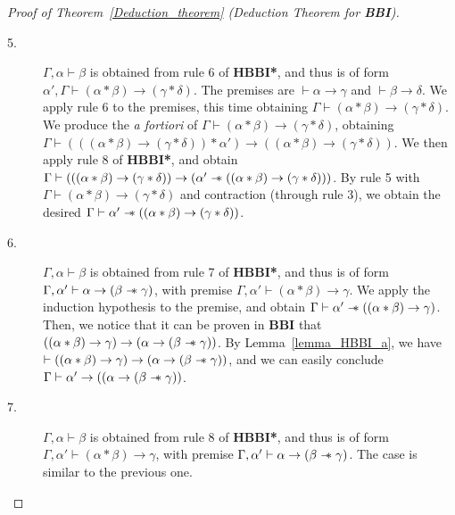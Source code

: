\documentclass[a4paper]{article}
\newcommand\magicwand{\mathrel{-\mkern-6mu*}}
\newcommand{\BBI}{\textbf{BBI}\xspace}
\begin{document}
\begin{proof}[Proof of Theorem~\ref{Deduction_theorem} (Deduction Theorem for \BBI)]
\begin{description}
        \item[5.] $\Gamma ,\alpha\vdash \beta$ is obtained from rule 6 of \textbf{HBBI*}, and thus is of form $\alpha', \Gamma \vdash (\alpha * \beta) \rightarrow (\gamma * \delta)$. The premises are $\vdash \alpha \rightarrow \gamma$ and $\vdash \beta \rightarrow \delta$. We apply rule 6 to the premises, this time obtaining $\Gamma \vdash (\alpha * \beta) \rightarrow (\gamma * \delta)$. We produce the \textit{a fortiori} of $\Gamma \vdash (\alpha * \beta) \rightarrow (\gamma * \delta)$, obtaining $\Gamma \vdash (((\alpha * \beta) \rightarrow (\gamma * \delta))* \alpha') \rightarrow ((\alpha * \beta) \rightarrow (\gamma * \delta))$. We then apply rule 8 of \textbf{HBBI*}, and obtain $\Gamma \vdash (((\alpha * \beta) \rightarrow (\gamma * \delta)) \rightarrow (\alpha' \magicwand ((\alpha * \beta) \rightarrow (\gamma * \delta)))$. By rule 5 with $\Gamma \vdash (\alpha * \beta) \rightarrow (\gamma * \delta)$ and contraction (through rule 3), we obtain the desired $\Gamma \vdash \alpha' \magicwand ((\alpha * \beta) \rightarrow (\gamma * \delta))$.

        \item[6.] $\Gamma ,\alpha\vdash \beta$ is obtained from rule 7 of \textbf{HBBI*}, and thus is of form 
        $\Gamma, \alpha' \vdash \alpha \rightarrow (\beta \magicwand \gamma)$, with premise $\Gamma, \alpha' \vdash (\alpha * \beta) \rightarrow \gamma$. We apply the induction hypothesis to the premise, and obtain $\Gamma \vdash \alpha' \magicwand ((\alpha * \beta) \rightarrow \gamma)$. Then, we notice that it can be proven in \BBI that $((\alpha * \beta)\rightarrow \gamma)\rightarrow (\alpha \rightarrow (\beta \magicwand \gamma))$. By Lemma~\ref{lemma_HBBI_a}, we have $\vdash((\alpha * \beta)\rightarrow \gamma)\rightarrow (\alpha \rightarrow (\beta \magicwand \gamma))$, and we can easily conclude $\Gamma \vdash \alpha' \rightarrow ((\alpha \rightarrow (\beta \magicwand \gamma))$.
        

        \item[7.] $\Gamma ,\alpha\vdash \beta$ is obtained from rule 8 of \textbf{HBBI*}, and thus is of form 
        $\Gamma, \alpha' \vdash (\alpha * \beta) \rightarrow \gamma$, with premise $\Gamma, \alpha' \vdash \alpha \rightarrow (\beta \magicwand \gamma)$. The case is similar to the previous one.



\end{description}
\end{proof}
\end{document}
